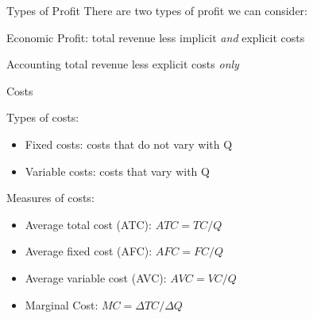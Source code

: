 \documentclass[compress]{beamer}
\begin{document}
\begin{frame}{Types of Profit}
    There are two types of profit we can consider:
    \begin{block}{Economic Profit:}
        total revenue less implicit \textit{and} explicit costs
    \end{block}

    \begin{block}{Accounting}
        total revenue less explicit costs \textit{only}
    \end{block}
\end{frame}

\begin{frame}{Costs}
\begin{block}{Types of costs:}
    \begin{itemize}
    \item Fixed costs: costs that do not vary with Q
    \item Variable costs: costs that vary with Q
\end{itemize}
\end{block}

\begin{block}{Measures of costs:}
\begin{itemize}
    \item Average total cost (ATC): \(ATC = TC/Q\)
    \item Average fixed cost (AFC): \(AFC = FC/Q\)
    \item Average variable cost (AVC): \(AVC = VC/Q\)
    \item Marginal Cost: \(MC = \Delta TC/\Delta Q\)
\end{itemize}
\end{block}
\end{frame}
\end{document}
